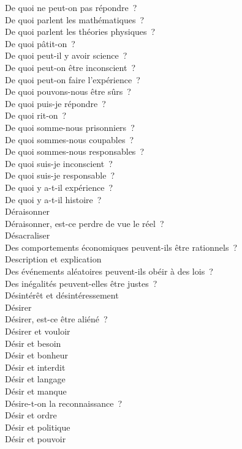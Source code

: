 \documentclass[a4paper,12pt]{article}
\begin{document}
De quoi ne peut-on pas répondre ? \\
De quoi parlent les mathématiques ? \\
De quoi parlent les théories physiques ? \\
De quoi pâtit-on ? \\
De quoi peut-il y avoir science ? \\
De quoi peut-on être inconscient ? \\
De quoi peut-on faire l'expérience ? \\
De quoi pouvons-nous être sûrs ? \\
De quoi puis-je répondre ? \\
De quoi rit-on ? \\
De quoi somme-nous prisonniers ? \\
De quoi sommes-nous coupables ? \\
De quoi sommes-nous responsables ? \\
De quoi suis-je inconscient ? \\
De quoi suis-je responsable ? \\
De quoi y a-t-il expérience ? \\
De quoi y a-t-il histoire ? \\
Déraisonner \\
Déraisonner, est-ce perdre de vue le réel ? \\
Désacraliser \\
Des comportements économiques peuvent-ils être rationnels ? \\
Description et explication \\
Des événements aléatoires peuvent-ils obéir à des lois ? \\
Des inégalités peuvent-elles être justes ? \\
Désintérêt et désintéressement \\
Désirer \\
Désirer, est-ce être aliéné ? \\
Désirer et vouloir \\
Désir et besoin \\
Désir et bonheur \\
Désir et interdit \\
Désir et langage \\
Désir et manque \\
Désire-t-on la reconnaissance ? \\
Désir et ordre \\
Désir et politique \\
Désir et pouvoir \\
\end{document}
